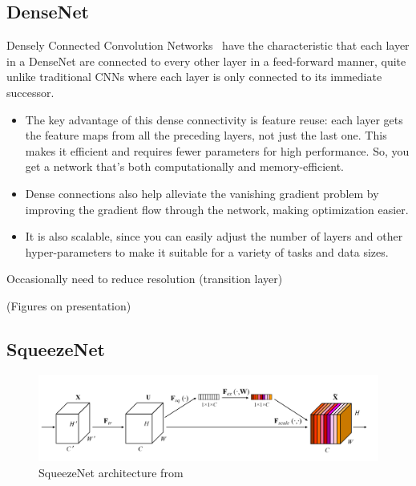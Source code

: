 \documentclass[11pt]{article}
\begin{document}
\subsection{DenseNet}

Densely Connected Convolution Networks~\cite{DenseNet} have the characteristic that each layer in a DenseNet are connected to every other layer in a feed-forward manner, quite unlike traditional CNNs where each layer is only connected to its immediate successor.

\begin{itemize}
    \item The key advantage of this dense connectivity is feature reuse: each layer gets the feature maps from all the preceding layers, not just the last one. This makes it efficient and requires fewer parameters for high performance. So, you get a network that's both computationally and memory-efficient.

    \item Dense connections also help alleviate the vanishing gradient problem by improving the gradient flow through the network, making optimization easier.
    
    \item It is also scalable, since you can easily adjust the number of layers and other hyper-parameters to make it suitable for a variety of tasks and data sizes.
\end{itemize}

Occasionally need to reduce resolution (transition layer)

(Figures on presentation)

\subsection{SqueezeNet}

\begin{figure}[H]
    \centering
    \includegraphics[trim={0 0 0 0},clip,width=\linewidth]{figures/SqueezeNet.png}
    \caption{SqueezeNet architecture from~\cite{SqueezeNet}} \label{fig:squeezeNet-architecture}
\end{figure}
\end{document}
